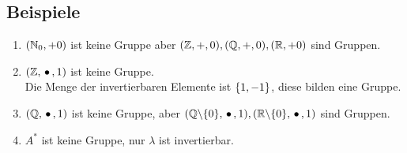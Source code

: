 \subsection{Beispiele}

\begin{enumerate}
	
	\item
	$(\mathbb{N}_0, + 0)$ ist keine Gruppe aber $(\mathbb{Z}, +, 0), (\mathbb{Q}, +, 0), (\mathbb{R}, + 0)$ sind Gruppen.
	
	\item
	$(\mathbb{Z}, \,{\bullet}\,, 1)$ ist keine Gruppe.
	\\ Die Menge der invertierbaren Elemente ist $\left\{1, -1\right\}$, diese bilden eine Gruppe.
	
	\item
	$(\mathbb{Q}, \,{\bullet}\,, 1)$ ist keine Gruppe, aber $(\mathbb{Q} \backslash \{0\}, \,{\bullet}\,, 1), (\mathbb{R} \backslash \{0\}, \,{\bullet}\,, 1)$ sind Gruppen.
	
	\item
	$A^*$ ist keine Gruppe, nur $\lambda$ ist invertierbar.
	
\end{enumerate}

